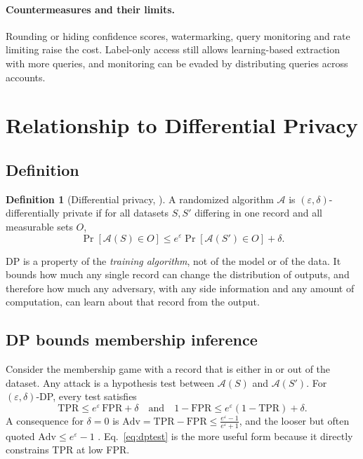 \documentclass[10pt,a4paper]{extarticle}
\theoremstyle{definition}
\newtheorem{definition}{Definition}[section]
\begin{document}
\paragraph{Countermeasures and their limits.} Rounding or hiding confidence scores, watermarking, query monitoring and rate limiting raise the cost. Label-only access still allows learning-based extraction with more queries, and monitoring can be evaded by distributing queries across accounts.

\section{Relationship to Differential Privacy}\label{sec:dp}

\subsection{Definition}

\begin{definition}[Differential privacy, \citealp{dwork2006calibrating}]
A randomized algorithm \(\mathcal{A}\) is \((\varepsilon,\delta)\)-differentially private if for all datasets \(S,S'\) differing in one record and all measurable sets \(O\),
\[
\Pr[\mathcal{A}(S)\in O]\le e^{\varepsilon}\Pr[\mathcal{A}(S')\in O]+\delta.
\]
\end{definition}

DP is a property of the \emph{training algorithm}, not of the model or of the data. It bounds how much any single record can change the distribution of outputs, and therefore how much any adversary, with any side information and any amount of computation, can learn about that record from the output.

\subsection{DP bounds membership inference}

Consider the membership game with a record that is either in or out of the dataset. Any attack is a hypothesis test between \(\mathcal{A}(S)\) and \(\mathcal{A}(S')\). For \((\varepsilon,\delta)\)-DP, every test satisfies \citep{kairouz2015composition}
\begin{equation}\label{eq:dptest}
\mathrm{TPR}\le e^{\varepsilon}\,\mathrm{FPR}+\delta
\quad\text{and}\quad
1-\mathrm{FPR}\le e^{\varepsilon}(1-\mathrm{TPR})+\delta.
\end{equation}
A consequence for \(\delta=0\) is \(\mathrm{Adv}=\mathrm{TPR}-\mathrm{FPR}\le\frac{e^{\varepsilon}-1}{e^{\varepsilon}+1}\), and the looser but often quoted \(\mathrm{Adv}\le e^{\varepsilon}-1\) \citep{yeom2018privacy}. Eq.~\eqref{eq:dptest} is the more useful form because it directly constrains TPR at low FPR.
\end{document}

